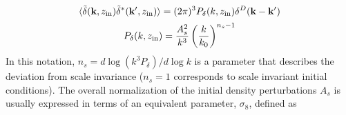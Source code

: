 \begin{equation}
\label{eq:1:initial-cond}
\langle\tilde{\delta}(\mathbf{k},z_{\rm in})\tilde{\delta}^*(\mathbf{k}',z_{\rm in})\rangle = (2\pi)^3 P_\delta(k,z_{\rm in})\delta^D(\mathbf{k}-\mathbf{k}')
\end{equation}
%
\begin{equation}
\label{eq:1:initial-ps}
P_\delta(k,z_{\rm in}) = \frac{A^2_s}{k^3}\left(\frac{k}{k_0}\right)^{n_s-1}
\end{equation}
%
In this notation, $n_s=d\log (k^3P_\delta)/d\log k$ is a parameter that describes the deviation from scale invariance ($n_s=1$ corresponds to scale invariant initial conditions). The overall normalization of the initial density perturbations $A_s$ is usually expressed in terms of an equivalent parameter, $\sigma_8$, defined as 

